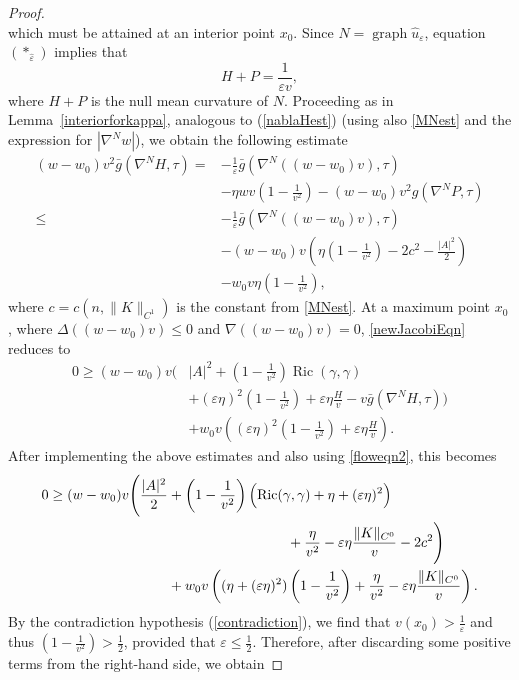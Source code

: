 \documentclass[11pt]{amsart}
\renewcommand{\epsilon}{\varepsilon}
\DeclareMathOperator{\graph}{graph} \DeclareMathOperator{\closure}{Closure}
\DeclareMathOperator{\Ric}{Ric}    \DeclareMathOperator{\Rm}{Rm}
\def\e{\epsilon}
\begin{document}
\begin{proof}
\begin{equation}
\end{equation}
which must be attained at an interior point $x_0$. Since $N=\graph\hat{u}_\e$, equation $(*_{\hat{\varepsilon}})$ implies that 
\begin{equation}\label{floweqn2}
H+P=\dfrac{1}{\varepsilon v},
\end{equation}
where $H+P$ is the null mean curvature of $N$.
Proceeding as in Lemma~\ref{interiorforkappa}, analogous to (\ref{nablaHest}) (using also \eqref{MNest} and the expression for $|\nabla^Nw|$), we obtain the following estimate
\begin{align*}
(w-w_0)v^2\bar g(\nabla^NH,\tau)=&-\frac{1}{\varepsilon}\bar g(\nabla^N((w-w_0)v),\tau)\\
&-{\eta} wv\left(1-\frac{1}{v^2}\right)-(w-w_0)v^2g(\nabla^NP,\tau)\\
\leq&-\frac{1}{\varepsilon}\bar g(\nabla^N((w-w_0)v),\tau)\\
&-(w-w_0)v\left({\eta}\left(1-\frac{1}{v^2}\right)-2c^2-\frac{|A|^2}{2}\right)\\
&-w_0v{\eta}\left(1-\frac{1}{v^2}\right),
\end{align*}
where $c=c(n, \|K\|_{C^1})$ is the constant from \eqref{MNest}.
At a maximum point $x_0$, where $\Delta((w-w_0)v)\leq0$ and $\nabla((w-w_0)v)=0$, \eqref{newJacobiEqn} reduces to
\begin{align*}
0\geq (w-w_0)v\Bigg(&|A|^2+\left(1-\frac{1}{v^2}\right)\Ric(\gamma,\gamma)\\
&+(\varepsilon\eta)^2\left(1-\frac{1}{v^2}\right)+\varepsilon\eta\frac{H}{v}-v\bar g(\nabla^NH,\tau)\Bigg)\\
&+w_0v\left((\varepsilon\eta)^2\left(1-\frac{1}{v^2}\right)+\varepsilon\eta\frac{H}{v}\right).
\end{align*}
After implementing the above estimates and also using \eqref{floweqn2}, this becomes
\begin{align*}
0\geq(w-w_0)v\Bigg(\frac{|A|^2}{2}&+\left(1-\frac{1}{v^2}\right)\Bigl(\Ric(\gamma,\gamma)+\eta+(\varepsilon\eta)^2\Bigr)\\
&\hspace{3cm}+\frac{\eta}{v^2}-\varepsilon\eta\frac{\|K\|_{C^0}}{v}-2c^2\Bigg)\\
&+w_0v\left((\eta+(\varepsilon\eta)^2)\left(1-\frac{1}{v^2}\right)+\frac{\eta}{v^2}-\varepsilon\eta\frac{\|K\|_{C^0}}{v}\right).
\end{align*}
By the contradiction hypothesis (\ref{contradiction}), we find that $v(x_0)>\frac{1}{\varepsilon}$ and thus $(1-\frac{1}{v^2})>\frac{1}{2}$, provided that $\varepsilon\leq\frac{1}{2}$. Therefore, after discarding some  positive terms from the right-hand side, we obtain

\end{proof}
\end{document}

